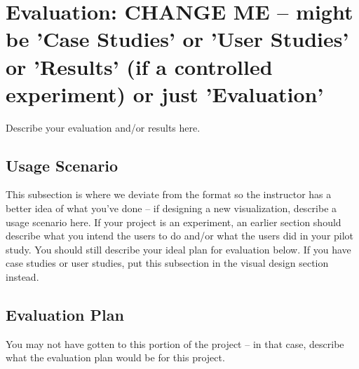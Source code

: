 \section{Evaluation: CHANGE ME -- might be 'Case Studies' or 'User Studies' or
'Results' (if a controlled experiment) or just 'Evaluation'} %
\label{sec:vis}

Describe your evaluation and/or results here. 

\subsection{Usage Scenario}
\label{sec:usage}

This subsection is where we deviate from the format so the instructor has a
better idea of what you've done -- if designing a new visualization, describe
a usage scenario here. If your project is an experiment, an earlier section
should describe what you intend the users to do and/or what the users did in
your pilot study. You should still describe your ideal plan for evaluation
below. If you have case studies or user studies, put this subsection in the
visual design section instead. 

\subsection{Evaluation Plan}
\label{sec:plan}

You may not have gotten to this portion of the project -- in that case,
describe what the evaluation plan would be for this project. 
